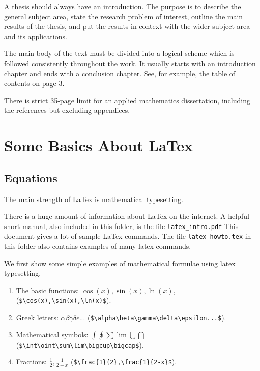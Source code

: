 \documentclass[11pt]{book}
\begin{document}
A thesis should always have an introduction.  The purpose is to describe the general subject area, state the research problem of interest, outline the main results of the thesis, and put the results in context with the wider subject area and its applications.

The main body of the text must be divided into a logical scheme which  is followed consistently throughout the work.  
 It usually starts with an introduction chapter  and ends with  a conclusion chapter. See, for example, the table of contents on page 3. 

There is strict  35-page limit  for an applied mathematics dissertation,  including  the references  but excluding  appendices. 


\section{Some Basics About LaTex } 

\subsection{Equations}
The main strength of LaTex is  mathematical typesetting.  

There is a huge amount of information about LaTex on the internet.
A helpful short manual, also included in this folder, is the file
\verb+latex_intro.pdf+
This document gives a lot of sample LaTex commands.  
The file \verb+latex-howto.tex+ in this folder also contains examples of many latex commands.




We first show  some simple examples of 
mathematical formulae using latex typesetting.

\begin{enumerate}
\item The basic functions: $\cos(x),  \sin(x),   \ln(x) $,  (\verb+$\cos(x),\sin(x),\ln(x)$+). 
\item Greek letters: $\alpha \beta \gamma \delta\epsilon...$ (\verb+$\alpha\beta\gamma\delta\epsilon...$+).
\item Mathematical symbols: $\int  \oint \sum\lim\bigcup \bigcap$
 (\verb+$\int\oint\sum\lim\bigcup\bigcap$+).
\item Fractions: $\frac{1}{2},\frac{1}{2-x}$ (\verb+$\frac{1}{2},\frac{1}{2-x}$+).
\end{enumerate}
\end{document}
